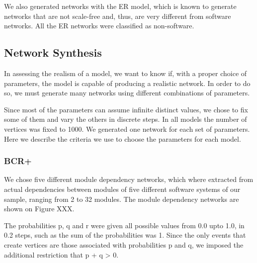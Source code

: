 We also generated networks with the ER model, which is known to generate
networks that are not scale-free and, thus, are very different from software
networks. All the ER networks were classified as non-software.



\subsection{Network Synthesis}

In assessing the realism of a model, we want to know if, with a proper choice of
parameters, the model is capable of producing a realistic network. In order to
do so, we must generate many networks using different combinations of
parameters. 

Since most of the parameters can assume infinite distinct values, we chose to
fix some of them and vary the others in discrete steps. In all models the number
of vertices was fixed to 1000. We generated one network for each set of
parameters. Here we describe the criteria we use to choose the parameters for
each model.

\subsubsection{BCR+}

We chose five different module dependency networks, which where extracted from
actual dependencies between modules of five different software systems of our
sample, ranging from 2 to 32 modules. The module dependency networks are shown
on Figure XXX. 

The probabilities p, q and r were given all possible values from 0.0 upto 1.0,
in 0.2 steps, such as the sum of the probabilities was 1. Since the only events
that create vertices are those associated with probabilities p and q, we imposed
the additional restriction that p + q > 0.

